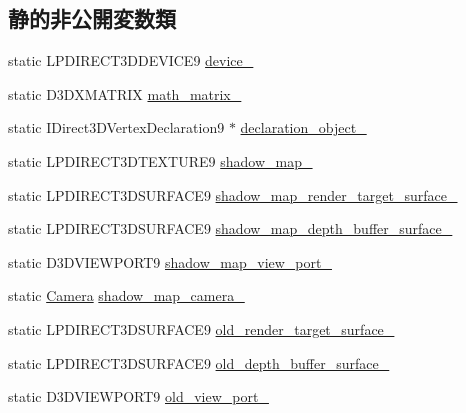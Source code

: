 \subsection*{静的非公開変数類}
\begin{DoxyCompactItemize}
\item 
static L\+P\+D\+I\+R\+E\+C\+T3\+D\+D\+E\+V\+I\+C\+E9 \mbox{\hyperlink{class_depth_buffer_shadow_object_a2e91bbbf8298fdb977f762fb871ff199}{device\+\_\+}}
\item 
static D3\+D\+X\+M\+A\+T\+R\+IX \mbox{\hyperlink{class_depth_buffer_shadow_object_a8cbcfff05093c1884d6e2c6ac15b9b0a}{math\+\_\+matrix\+\_\+}}
\item 
static I\+Direct3\+D\+Vertex\+Declaration9 $\ast$ \mbox{\hyperlink{class_depth_buffer_shadow_object_a20f1043c9809e9eaf06632b6dae4dafe}{declaration\+\_\+object\+\_\+}}
\item 
static L\+P\+D\+I\+R\+E\+C\+T3\+D\+T\+E\+X\+T\+U\+R\+E9 \mbox{\hyperlink{class_depth_buffer_shadow_object_a247d49044c3cea346785514768ecb578}{shadow\+\_\+map\+\_\+}}
\item 
static L\+P\+D\+I\+R\+E\+C\+T3\+D\+S\+U\+R\+F\+A\+C\+E9 \mbox{\hyperlink{class_depth_buffer_shadow_object_a083e7d970cf89fd220787393bdb2d8e2}{shadow\+\_\+map\+\_\+render\+\_\+target\+\_\+surface\+\_\+}}
\item 
static L\+P\+D\+I\+R\+E\+C\+T3\+D\+S\+U\+R\+F\+A\+C\+E9 \mbox{\hyperlink{class_depth_buffer_shadow_object_a2fe67be29e0c2c6cb1c74860d8f90b37}{shadow\+\_\+map\+\_\+depth\+\_\+buffer\+\_\+surface\+\_\+}}
\item 
static D3\+D\+V\+I\+E\+W\+P\+O\+R\+T9 \mbox{\hyperlink{class_depth_buffer_shadow_object_a08c029f49fa8cf59b8458d3c2be0138e}{shadow\+\_\+map\+\_\+view\+\_\+port\+\_\+}}
\item 
static \mbox{\hyperlink{class_camera}{Camera}} \mbox{\hyperlink{class_depth_buffer_shadow_object_a6f32e81131358b61184b514e44bdb44d}{shadow\+\_\+map\+\_\+camera\+\_\+}}
\item 
static L\+P\+D\+I\+R\+E\+C\+T3\+D\+S\+U\+R\+F\+A\+C\+E9 \mbox{\hyperlink{class_depth_buffer_shadow_object_abfeefee54df20a800a8fc33365332724}{old\+\_\+render\+\_\+target\+\_\+surface\+\_\+}}
\item 
static L\+P\+D\+I\+R\+E\+C\+T3\+D\+S\+U\+R\+F\+A\+C\+E9 \mbox{\hyperlink{class_depth_buffer_shadow_object_aa3a73112a31ff2665079f86ab592559e}{old\+\_\+depth\+\_\+buffer\+\_\+surface\+\_\+}}
\item 
static D3\+D\+V\+I\+E\+W\+P\+O\+R\+T9 \mbox{\hyperlink{class_depth_buffer_shadow_object_aaeb83afec448ed26aba19b2b40bb6667}{old\+\_\+view\+\_\+port\+\_\+}}

\end{DoxyCompactItemize}
